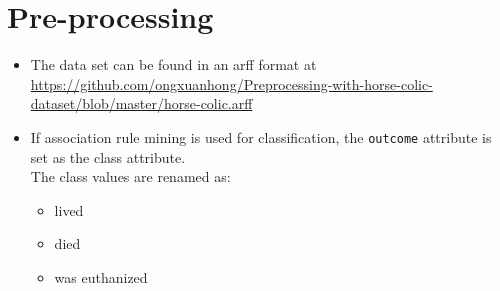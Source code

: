 \section{Pre-processing}

\begin{itemize}

\item The data set can be found in an arff format at \\ \href{github.com/ongxuanhong/Preprocessing-with-horse-colic-dataset/blob/master/horse-colic.arff}{https://github.com/ongxuanhong/Preprocessing-with-horse-colic-dataset/blob/master/horse-colic.arff}

\item If association rule mining is used for classification, the \verb|outcome| attribute is set as the class attribute.\\
The class values are renamed as:
\begin{itemize}
\item lived
\item died
\item was euthanized
\end{itemize}

\end{itemize}